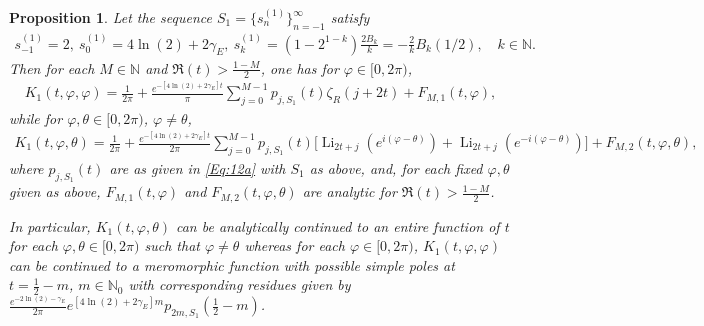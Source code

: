 \documentclass[letterpaper,10pt]{amsart}
\newtheorem{prop}[thm]{Proposition}
\DeclareMathOperator{\Li}{Li}
\numberwithin{equation}{section}
\begin{document}
\begin{prop}
Let the sequence $S_1=\{s_n^{(1)}\}_{n=-1}^\infty$ satisfy
\begin{align}
 s_{-1}^{(1)}=2,\ s_0^{(1)}=4\ln(2)+2\gamma_E,\ s_k^{(1)}=(1-2^{1-k})\frac{2 B_{k}}{k}=-\frac{2}{k}B_k(1/2),\quad k\in\mathbb{N}.
\end{align} 
Then for each $M\in\mathbb{N}$ and $\Re(t) > \frac{1-M}{2}$, one has for $\varphi\in[0,2\pi)$,
\begin{align}\label{Eq:29a}
    K_1(t,\varphi,\varphi) = \frac{1}{2\pi}+\frac{e^{-[4\ln(2)+2\gamma_E] t}}{\pi}\sum_{j=0}^{M-1}p_{j,S_1}(t)\zeta_R(j+2t)+F_{M,1}(t,\varphi),
\end{align}
while for $\varphi,\theta\in[0,2\pi)$, $\varphi\neq\theta$,
\begin{align}\label{Eq:29aa}
    K_1(t,\varphi,\theta) = \frac{1}{2\pi}+\frac{e^{-[4\ln(2)+2\gamma_E] t}}{2\pi}\sum_{j=0}^{M-1}p_{j,S_1}(t)\big[\Li_{2t+j}(e^{i(\varphi-\theta)})+\Li_{2t+j}(e^{-i(\varphi-\theta)})\big]+ F_{M,2}(t,\varphi,\theta),
\end{align}
where $p_{j,S_1}(t)$ are as given in \eqref{Eq:12a} with $S_1$ as above, and, for each fixed $\varphi,\theta$ given as above, $F_{M,1}(t,\varphi)$ and $F_{M,2}(t,\varphi,\theta)$ are analytic for $\Re(t) > \frac{1-M}{2}$.

In particular, $K_1(t,\varphi,\theta)$ can be analytically continued to an entire function of $t$ for each $\varphi,\theta\in[0,2\pi)$ such that $\varphi\neq\theta$ whereas for each $\varphi\in[0,2\pi)$, $K_1(t,\varphi,\varphi)$ can be continued to a meromorphic function with possible simple poles at $t=\frac{1}{2}-m$, $m\in\mathbb{N}_0$ with corresponding residues given by $\frac{e^{-2\ln(2)-\gamma_E}}{2\pi}e^{[4\ln(2)+2\gamma_E] m}p_{2m,S_1}(\frac{1}{2}-m)$.
\end{prop}
\end{document}
